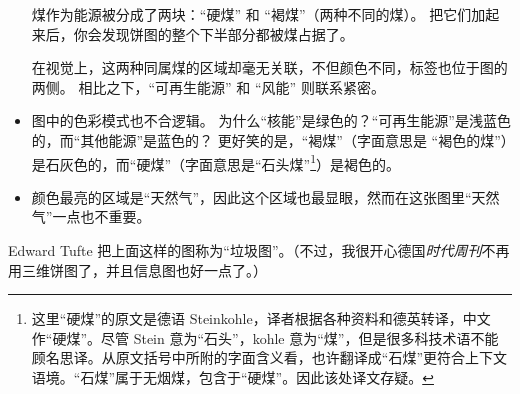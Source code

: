 \begin{itemize}
  煤作为能源被分成了两块：“硬煤” 和 “褐煤”（两种不同的煤）。
  把它们加起来后，你会发现饼图的整个下半部分都被煤占据了。

  在视觉上，这两种同属煤的区域却毫无关联，不但颜色不同，标签也位于图的两侧。
  相比之下，“可再生能源” 和 “风能” 则联系紧密。

\item
  图中的色彩模式也不合逻辑。
  为什么“核能”是绿色的？“可再生能源”是浅蓝色的，而“其他能源”是蓝色的？
  更好笑的是，“褐煤”（字面意思是 “褐色的煤”）是石灰色的，而“硬煤”（字面意思是“石头煤”\footnote{\color{blue} 这里“硬煤”的原文是德语 Steinkohle，译者根据各种资料和德英转译，中文作“硬煤”。尽管 Stein 意为“石头”，kohle 意为“煤”，但是很多科技术语不能顾名思译。从原文括号中所附的字面含义看，也许翻译成“石煤”更符合上下文语境。“石煤”属于无烟煤，包含于“硬煤”。因此该处译文存疑。}）是褐色的。

\item
  颜色最亮的区域是“天然气”，因此这个区域也最显眼，然而在这张图里“天然气”一点也不重要。

\end{itemize}

\bohs

Edward Tufte 把上面这样的图称为“垃圾图”。（不过，我很开心德国\emph{时代周刊}不再用三维饼图了，并且信息图也好一点了。）

